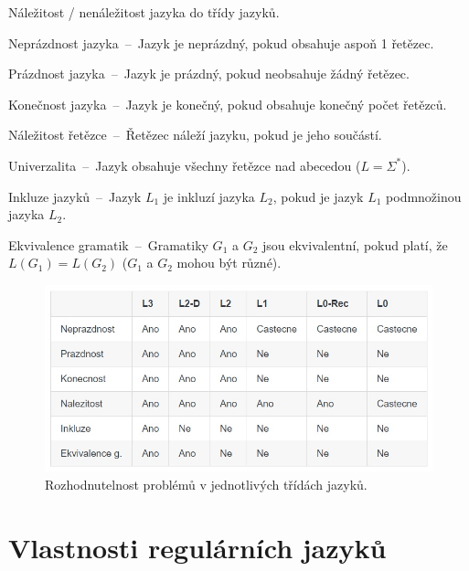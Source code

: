 \begin{compactitem}
    \item Náležitost / nenáležitost jazyka do třídy jazyků.

    \item Neprázdnost jazyka~--~Jazyk je neprázdný, pokud obsahuje aspoň 1 řetězec.

    \item Prázdnost jazyka~--~Jazyk je prázdný, pokud neobsahuje žádný řetězec.

    \item Konečnost jazyka~--~Jazyk je konečný, pokud obsahuje konečný počet řetězců.

    \item Náležitost řetězce~--~Řetězec náleží jazyku, pokud je jeho součástí.

    \item Univerzalita~--~Jazyk obsahuje všechny řetězce nad abecedou ($L = \Sigma^* $).

    \item Inkluze jazyků~--~Jazyk $L_1$ je inkluzí jazyka $L_2$, pokud je jazyk $L_1$ podmnožinou jazyka $L_2$.

    \item Ekvivalence gramatik~--~Gramatiky $G_1$ a $G_2$ jsou ekvivalentní, pokud platí, že\break $L(G_1) = L(G_2)$ ($G_1$ a $G_2$ mohou být různé).
\end{compactitem}

\begin{figure}[H]
    \centering
    \includegraphics[width=1\linewidth]{rozhodnutelnost_jazyku.png}
    \caption{Rozhodnutelnost problémů v jednotlivých třídách jazyků.}
\end{figure}


\section{Vlastnosti regulárních jazyků}

